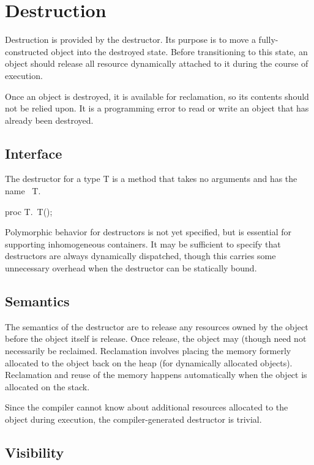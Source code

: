 \section{Destruction}

Destruction is provided by the destructor.  Its purpose is to move a
fully-constructed object into the destroyed state.  Before transitioning to this
state, an object should release all resource dynamically attached to it during
the course of execution.

Once an object is destroyed, it is available for reclamation, so its contents
should not be relied upon.  It is a programming error to read or write an object
that has already been destroyed.

\subsection{Interface}

The destructor for a type T is a method that takes no arguments and has the name ~T.
\begin{chapel}
proc T.~T();
\end{chapel}

\begin{openissue}
Polymorphic behavior for destructors is not yet specified, but is essential for
supporting inhomogeneous containers.  It may be sufficient to specify that
destructors are always dynamically dispatched, though this carries some
unnecessary overhead when the destructor can be statically bound.
\end{openissue}

\subsection{Semantics}

The semantics of the destructor are to release any resources owned by the object
before the object itself is release.  Once release, the object may (though need
not necessarily be reclaimed.  Reclamation involves placing the memory formerly
allocated to the object back on the heap (for dynamically allocated objects).
Reclamation and reuse of the memory happens automatically when the object is
allocated on the stack.

Since the compiler cannot know about additional resources allocated to the
object during execution, the compiler-generated destructor is trivial.

\subsection{Visibility}

